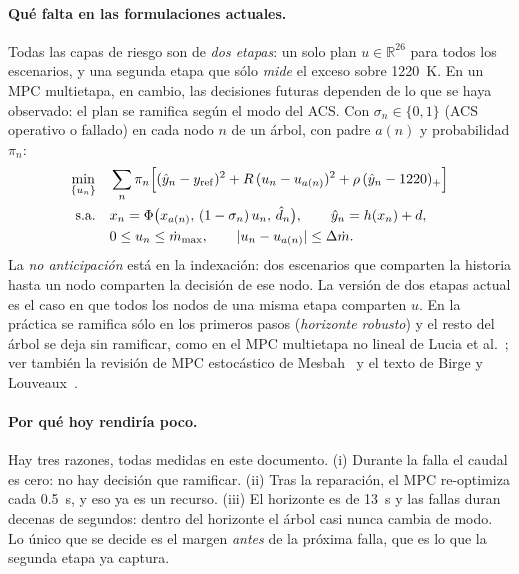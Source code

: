 \paragraph{Qué falta en las formulaciones actuales.} Todas las capas de riesgo son de \emph{dos
etapas}: un solo plan $u\in\mathbb R^{26}$ para todos los escenarios, y una segunda etapa que sólo
\emph{mide} el exceso sobre 1220~K. En un MPC multietapa, en cambio, las decisiones futuras
dependen de lo que se haya observado: el plan se ramifica según el modo del ACS. Con
$\sigma_n\in\{0,1\}$ (ACS operativo o fallado) en cada nodo $n$ de un árbol, con padre $a(n)$ y
probabilidad $\pi_n$:
\begin{align*}
\min_{\{u_n\}}\quad & \sum_n\pi_n\Big[(\hat y_n-y_{\rm ref})^2+R\,(u_n-u_{a(n)})^2+\rho\,(\hat y_n-1220)_+\Big]\\
\text{s.a.}\quad & x_n=\Phi\big(x_{a(n)},\,(1-\sigma_n)\,u_n,\,\hat d_n\big),\qquad \hat y_n=h(x_n)+d,\\
& 0\le u_n\le\dot m_{\max},\qquad |u_n-u_{a(n)}|\le\Delta\dot m .
\end{align*}
La \emph{no anticipación} está en la indexación: dos escenarios que comparten la historia hasta un
nodo comparten la decisión de ese nodo. La versión de dos etapas actual es el caso en que todos los
nodos de una misma etapa comparten $u$. En la práctica se ramifica sólo en los primeros pasos
(\emph{horizonte robusto}) y el resto del árbol se deja sin ramificar, como en el MPC multietapa
no lineal de Lucia et al.~\cite{lucia2013}; ver también la revisión de MPC estocástico de
Mesbah~\cite{mesbah2016} y el texto de Birge y Louveaux~\cite{birge2011}.

\paragraph{Por qué hoy rendiría poco.} Hay tres razones, todas medidas en este documento.
(i) Durante la falla el caudal es cero: no hay decisión que ramificar. (ii) Tras la reparación,
el MPC re-optimiza cada 0.5~s, y eso ya es un recurso. (iii) El horizonte es de 13~s y las fallas
duran decenas de segundos: dentro del horizonte el árbol casi nunca cambia de modo. Lo único que se
decide es el margen \emph{antes} de la próxima falla, que es lo que la segunda etapa ya captura.

